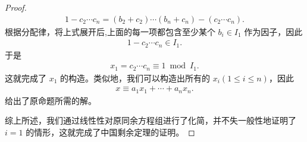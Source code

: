 \documentclass[../../main.tex]{subfiles}
\begin{document}
\begin{proof}
\begin{align*}
1 - c_2 \cdots c_n = (b_2 + c_2) \cdots (b_n + c_n) - (c_2 \cdots c_n) .
\end{align*}
根据分配律，将上式展开后,上面的每一项都包含至少某个 $b_i \in I_1$ 作为因子，因此
\begin{align*}
1 - c_2 \cdots c_n \in I_1 .
\end{align*}
于是
\begin{align*}
x_1 = c_2 \cdots c_n \equiv 1 \bmod I_1 .
\end{align*}
这就完成了 $x_1$ 的构造。类似地，我们可以构造出所有的 $x_i (1 \leqslant i \leqslant n)$，因此
\begin{align*}
x \equiv a_1 x_1 + \cdots + a_n x_n .
\end{align*}
给出了原命题所需的解。

综上所述，我们通过线性性对原同余方程组进行了化简，并不失一般性地证明了 $i = 1$ 的情形，这就完成了中国剩余定理的证明。
\end{proof}
\end{document}
